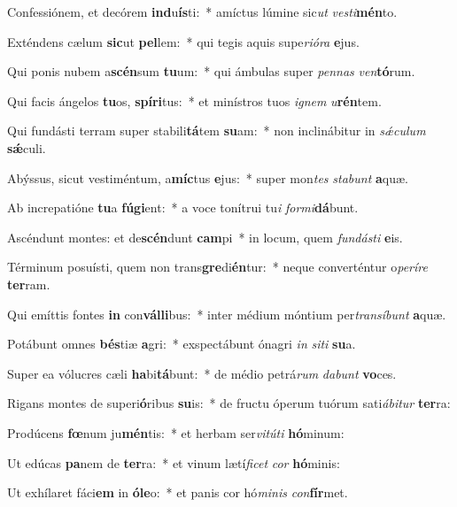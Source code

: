 \item Confessiónem, et decórem \textbf{ind}u\textbf{ís}ti:~* amíctus lúmine sic\textit{ut} \textit{ves}\textit{ti}\textbf{mén}to.
\item Exténdens cælum \textbf{sic}ut \textbf{pel}lem:~* qui tegis aquis supe\textit{ri}\textit{ó}\textit{ra} \textbf{e}jus.
\item Qui ponis nubem a\textbf{scén}sum \textbf{tu}um:~* qui ámbulas super \textit{pen}\textit{nas} \textit{ven}\textbf{tó}rum.
\item Qui facis ángelos \textbf{tu}os, \textbf{spí}\textbf{ri}tus:~* et minístros tuos \textit{i}\textit{gnem} \textit{u}\textbf{rén}tem.
\item Qui fundásti terram super stabili\textbf{tá}tem \textbf{su}am:~* non inclinábitur in \textit{sǽ}\textit{cu}\textit{lum} \textbf{sǽ}culi.
\item Abýssus, sicut vestiméntum, a\textbf{míc}tus \textbf{e}jus:~* super mon\textit{tes} \textit{sta}\textit{bunt} \textbf{a}quæ.
\item Ab increpatióne \textbf{tu}a \textbf{fú}\textbf{gi}ent:~* a voce tonítrui tu\textit{i} \textit{for}\textit{mi}\textbf{dá}bunt.
\item Ascéndunt montes: et de\textbf{scén}dunt \textbf{cam}pi~* in locum, quem \textit{fun}\textit{dás}\textit{ti} \textbf{e}is.
\item Términum posuísti, quem non trans\textbf{gre}di\textbf{én}tur:~* neque converténtur o\textit{pe}\textit{rí}\textit{re} \textbf{ter}ram.
\item Qui emíttis fontes \textbf{in} con\textbf{vál}\textbf{li}bus:~* inter médium móntium per\textit{trans}\textit{í}\textit{bunt} \textbf{a}quæ.
\item Potábunt omnes \textbf{bés}tiæ \textbf{a}gri:~* exspectábunt ónagri \textit{in} \textit{si}\textit{ti} \textbf{su}a.
\item Super ea vólucres cæli \textbf{ha}bi\textbf{tá}bunt:~* de médio petrá\textit{rum} \textit{da}\textit{bunt} \textbf{vo}ces.
\item Rigans montes de superi\textbf{ó}ribus \textbf{su}is:~* de fructu óperum tuórum sati\textit{á}\textit{bi}\textit{tur} \textbf{ter}ra:
\item Prodúcens \textbf{fœ}num ju\textbf{mén}tis:~* et herbam ser\textit{vi}\textit{tú}\textit{ti} \textbf{hó}minum:
\item Ut edúcas \textbf{pa}nem de \textbf{ter}ra:~* et vinum lætí\textit{fi}\textit{cet} \textit{cor} \textbf{hó}minis:
\item Ut exhílaret fáci\textbf{em} in \textbf{ó}\textbf{le}o:~* et panis cor hó\textit{mi}\textit{nis} \textit{con}\textbf{fír}met.
